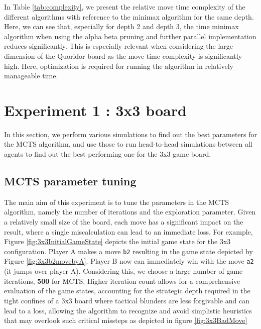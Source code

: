 In Table \ref{tab:complexity}, we present the relative move time complexity of the different algorithms with reference to the minimax algorithm for the same depth. Here, we can see that, especially for depth 2 and depth 3, the time minimax algorithm when using the alpha beta pruning and further parallel implementation reduces significantly. This is especially relevant when considering the large dimension of the Quoridor board as the move time complexity is significantly high. Here, optimization is required for running the algorithm in relatively manageable time.

\section{Experiment 1 : 3x3 board}

In this section, we perform various simulations to find out the best parameters for the \gls{MCTS} algorithm, and use those to run head-to-head simulations between all agents to find out the best performing one for the 3x3 game board.

\subsection{MCTS parameter tuning}

The main aim of this experiment is to tune the parameters in the MCTS algorithm, namely the number of iterations and the exploration parameter. Given a relatively small size of the board, each move has a significant impact on the result, where a single miscalculation can lead to an immediate loss. For example, Figure \ref{fig:3x3InitialGameState} depicts the initial game state for the 3x3 configuration. Player A makes a move \texttt{b2} resulting in the game state depicted by Figure \ref{fig:3x3b2movebyA}. Player B now can immediately win with the move \texttt{a2} (it jumps over player A). Considering this, we choose a large number of game iterations, \textbf{500} for MCTS. Higher iteration count allows for a comprehensive evaluation of the game states, accounting for the strategic depth required in the tight confines of a 3x3 board where tactical blunders are less forgivable and can lead to a loss, allowing the algorithm to recognize and avoid simplistic heuristics that may overlook such critical missteps as depicted in figure \ref{fig:3x3BadMove}

